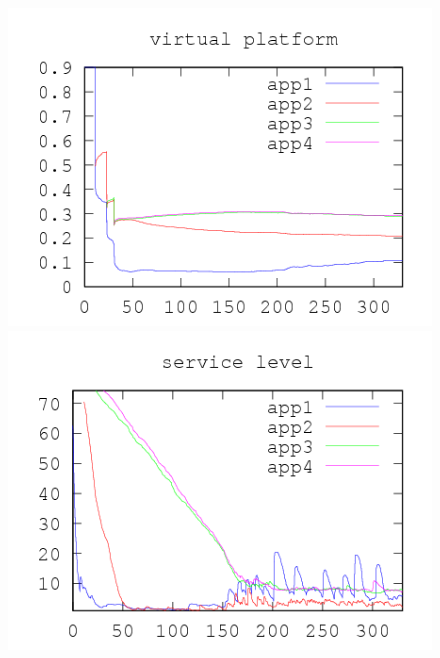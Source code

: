\documentclass[nobiblatex]{LTHthesis}
\begin{document}
\begin{figure}[th]
\centering
  \begin{minipage}{0.49\textwidth}
  \centering
  \includegraphics[width=\textwidth]{"tools/plot/logs/test4/vp"}
  \end{minipage}
  \hfill
  \begin{minipage}{0.49\textwidth}
  \centering
  \includegraphics[width=\textwidth]{"tools/plot/logs/test4/sl"}
  \end{minipage}
  \begin{minipage}{0.49\textwidth}
  \centering

\end{minipage}
\end{figure}
\end{document}
